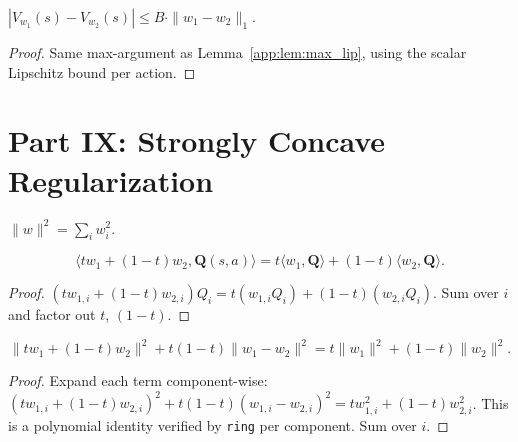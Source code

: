 \begin{lemma}
$|V_{w_1}(s) - V_{w_2}(s)| \le B \cdot \|w_1 - w_2\|_1$.
\end{lemma}
\begin{proof}
Same max-argument as Lemma~\ref{app:lem:max_lip}, using the scalar Lipschitz bound per action.
\end{proof}


\section{Part IX: Strongly Concave Regularization}
\label{app:strong_concavity}

\begin{definition}
$\|w\|^2 = \sum_i w_i^2$.
\end{definition}

\begin{lemma}
\begin{equation}
    \langle tw_1 + (1{-}t)w_2, \mathbf{Q}(s,a) \rangle = t\langle w_1, \mathbf{Q} \rangle + (1{-}t)\langle w_2, \mathbf{Q} \rangle.
\end{equation}
\end{lemma}
\begin{proof}
$(t w_{1,i} + (1{-}t) w_{2,i}) Q_i = t(w_{1,i} Q_i) + (1{-}t)(w_{2,i} Q_i)$.  Sum over $i$ and factor out $t$, $(1{-}t)$.
\end{proof}

\begin{lemma}
\label{lem:parallelogram}
\begin{equation}
    \|tw_1 + (1{-}t)w_2\|^2 + t(1{-}t)\|w_1 - w_2\|^2 = t\|w_1\|^2 + (1{-}t)\|w_2\|^2.
\end{equation}
\end{lemma}
\begin{proof}
Expand each term component-wise: $(tw_{1,i} + (1{-}t)w_{2,i})^2 + t(1{-}t)(w_{1,i} - w_{2,i})^2 = t w_{1,i}^2 + (1{-}t) w_{2,i}^2$.  This is a polynomial identity verified by \texttt{ring} per component.  Sum over $i$.
\end{proof}

